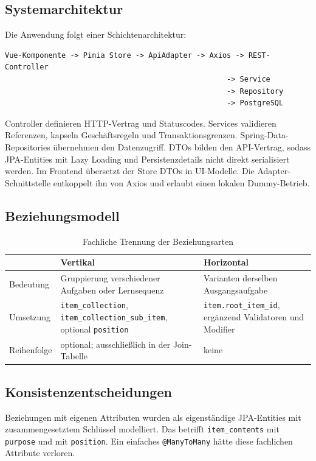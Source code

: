 \documentclass[11pt,a4paper]{article}
\begin{document}
\subsection{Systemarchitektur}
Die Anwendung folgt einer Schichtenarchitektur:
\begin{verbatim}
Vue-Komponente -> Pinia Store -> ApiAdapter -> Axios -> REST-Controller
                                                   -> Service
                                                   -> Repository
                                                   -> PostgreSQL
\end{verbatim}
Controller definieren HTTP-Vertrag und Statuscodes. Services validieren
Referenzen, kapseln Geschäftsregeln und Transaktionsgrenzen. Spring-Data-
Repositories übernehmen den Datenzugriff. DTOs bilden den API-Vertrag, sodass
JPA-Entities mit Lazy Loading und Persistenzdetails nicht direkt serialisiert
werden. Im Frontend übersetzt der Store DTOs in UI-Modelle. Die Adapter-
Schnittstelle entkoppelt ihn von Axios und erlaubt einen lokalen Dummy-Betrieb.

\subsection{Beziehungsmodell}
\begin{table}[H]\centering
\begin{tabularx}{\linewidth}{|l|Y|Y|}\hline
&\textbf{Vertikal}&\textbf{Horizontal}\\\hline
Bedeutung&Gruppierung verschiedener Aufgaben oder Lernsequenz&
Varianten derselben Ausgangsaufgabe\\
Umsetzung&\texttt{item\_collection},
\texttt{item\_collection\_sub\_item}, optional \texttt{position}&
\texttt{item.root\_item\_id}, ergänzend Validatoren und Modifier\\
Reihenfolge&optional; ausschließlich in der Join-Tabelle&keine\\
\hline
\end{tabularx}
\caption{Fachliche Trennung der Beziehungsarten}
\end{table}

\subsection{Konsistenzentscheidungen}
Beziehungen mit eigenen Attributen wurden als eigenständige JPA-Entities mit
zusammengesetztem Schlüssel modelliert. Das betrifft
\texttt{item\_contents} mit \texttt{purpose} und
 mit \texttt{position}. Ein einfaches
\texttt{@ManyToMany} hätte diese fachlichen Attribute verloren.
\end{document}
